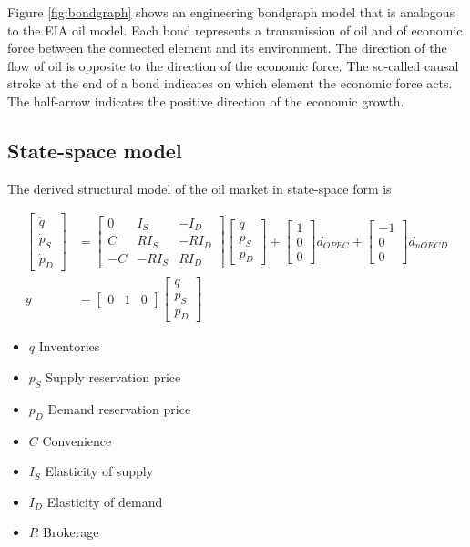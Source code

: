 Figure \ref{fig:bondgraph} shows an engineering bondgraph model that is analogous to the EIA oil model.
Each bond represents a transmission of oil and of economic force between the connected element and its environment. 
The direction of the flow of oil is opposite to the direction of the economic force.
The so-called causal stroke at the end of a bond indicates on which element the economic force acts.
The half-arrow indicates the positive direction of the economic growth.


\subsection{State-space model}
The derived structural model of the oil market in state-space form is



\begin{align}
\begin{bmatrix}
    \dot{q}\\ \dot{p}_S\\ \dot{p}_D
\end{bmatrix}
&=
\begin{bmatrix}
 0&I_S&-I_D\\
 C&RI_S&-RI_D\\
 -C&-RI_S&RI_D
    \end{bmatrix}
\begin{bmatrix}
    q\\ p_S\\  p_D
    \end{bmatrix}
+
\begin{bmatrix}
    1\\0\\0
\end{bmatrix}d_{OPEC}
+
\begin{bmatrix}
    -1\\0\\0
\end{bmatrix}d_{nOECD}\\
y&=\begin{bmatrix}
    0&1&0
    \end{bmatrix}
\begin{bmatrix}
     q\\ p_S\\  p_D
\end{bmatrix}
\end{align}

\begin{itemize}
    \item $q$ Inventories
    \item $p_S$ Supply reservation price
    \item $p_D$ Demand reservation price
    \item $C$ Convenience
    \item $I_S$   Elasticity of supply
    \item $I_D$   Elasticity of demand
    \item $R$   Brokerage 
\end{itemize}







